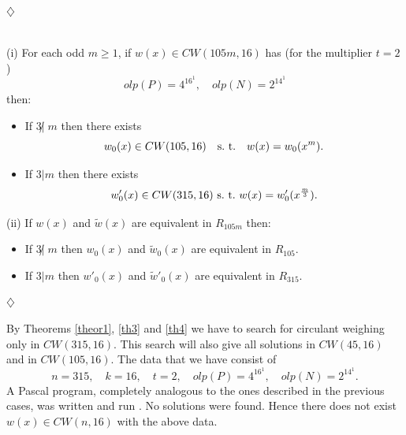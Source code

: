 {{{\begin{enumerate}
\begin{thm}
\begin{itemize}
	\end{itemize}

\end{thm}
		   \begin{flushright}
				$\diamondsuit$
		   \end{flushright}
     

\begin{thm} \label{th4}
{ \ }\\
(i)    For each odd $m \geq1 $, if $w(x) \in CW(105m,16)$ has (for the 
       multiplier $t=2$) 
		$$olp(P)=4^16^1, \quad olp(N)=2^14^1$$ 
       then:
       \begin{itemize}
	\item If $3 \not| \; m$ then there exists 
		$$w_0(x) \in CW(105,16) \quad {\rm s. \ t.} \quad w(x)=w_0(x^m).$$ 
	\item If $3 | m$ then there exists  
	$$w'_0(x) \in CW(315,16) \ {\rm s. \ t.} \ w(x)=w'_0(x^{\frac{m}{3}}).$$ 
	\end{itemize}
      
(ii)  If $w(x)$ and $\widetilde{w}(x)$ are equivalent in $R_{105m}$ then: 
	\begin{itemize}
	  \item 
		If  $3 \not| \; m$ then $w_0(x)$ and $\widetilde{w}_0(x)$ are 
		equivalent in $R_{105}$. 
	  \item 
		If $3 | m$ then $w'_0(x)$ and $\widetilde{w}'_0(x)$ are 
		equivalent in $R_{315}$. 
		
	\end{itemize}

\end{thm}
    
		   \begin{flushright}
				$\diamondsuit$
		   \end{flushright}

	 By Theorems \ref{theor1}, \ref{th3} and \ref{th4} 
	 we have to search for circulant weighing only in $CW(315,16)$. 
	 This search will also give all solutions in $CW(45,16)$ and in 
	 $CW(105, 16)$. The data that we have consist of 
		$$n=315, \quad k=16, \quad t=2, \quad olp(P)=4^16^1, \quad olp(N)=2^14^1.$$ 
	 A Pascal program,
	 completely analogous to the ones
	 described in the previous cases, was written and run . No solutions 
	 were found. Hence there does not exist $w(x) \in CW(n,16)$ with the above data.



\end{enumerate}
	    
}}}
